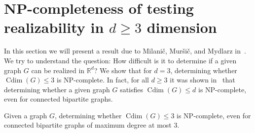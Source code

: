 \documentclass[12pt,a4paper,titlepage,openany]{report}
\DeclareMathOperator{\Cdim}{Cdim}
\begin{document}
\section{NP-completeness of testing realizability in $d\geq 3$ dimension}

In this section we will present a result due to Milani\v c, Mur\v si\v c, and Mydlarz in~\cite{Milanic}.
We try to understand the question: How difficult is it to determine if a given graph $G$ can be realized in $\mathbb{R}^d$?
We show that for $d=3$, determining whether $\Cdim(G)\leq 3$ is NP-complete. In fact, for all $d\geq 3$ it was shown in~\cite{Milanic} that determining whether a given graph $G$ satisfies $\Cdim(G) \leq d$ is NP-complete, even for connected bipartite graphs.

\begin{theorem}
Given a graph $G$, determining whether $\Cdim(G) \leq 3$ is NP-complete, even for connected bipartite graphs of maximum degree at most 3.
\end{theorem}
\end{document}
